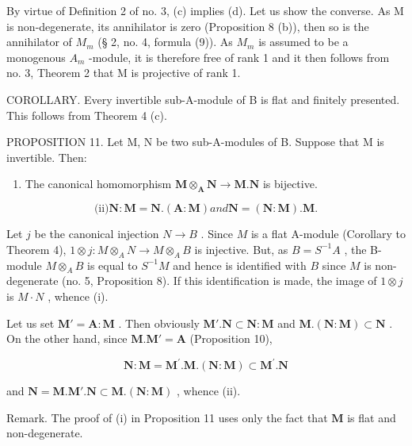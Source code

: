By virtue of Definition 2 of no. 3, (c) implies (d). Let us show the converse. As M is non-degenerate, its annihilator is zero (Proposition 8 (b)), then so is the annihilator of \(M_{m}\) (§ 2, no. 4, formula (9)). As \(M_{m}\) is assumed to be a monogenous \(A_{m}\) -module, it is therefore free of rank 1 and it then follows from no. 3, Theorem 2 that M is projective of rank 1.

COROLLARY. Every invertible sub-A-module of B is flat and finitely presented. This follows from Theorem 4 (c).

PROPOSITION 11. Let M, N be two sub-A-modules of B. Suppose that M is invertible. Then:

\begin{enumerate}
\def\labelenumi{(\roman{enumi})}
\tightlist
\item
  The canonical homomorphism \(\mathbf{M} \otimes_{\mathbf{A}} \mathbf{N} \to \mathbf{M}. \mathbf{N}\) is bijective.
\end{enumerate}

\[
\text {(ii)} \mathbf {N}: \mathbf {M} = \mathbf {N}. (\mathbf {A}: \mathbf {M}) a n d \mathbf {N} = (\mathbf {N}: \mathbf {M}). \mathbf {M}.
\]

Let \(j\) be the canonical injection \(N \to B\) . Since \(M\) is a flat A-module (Corollary to Theorem 4), \(1 \otimes j \colon M \otimes_{A} N \to M \otimes_{A} B\) is injective. But, as \(B = S^{-1}A\) , the B-module \(M \otimes_{A} B\) is equal to \(S^{-1}M\) and hence is identified with \(B\) since \(M\) is non-degenerate (no. 5, Proposition 8). If this identification is made, the image of \(1 \otimes j\) is \(M \cdot N\) , whence (i).

Let us set \(\mathbf{M}' = \mathbf{A} : \mathbf{M}\) . Then obviously \(\mathbf{M}' . \mathbf{N} \subset \mathbf{N} : \mathbf{M}\) and \(\mathbf{M} . (\mathbf{N} : \mathbf{M}) \subset \mathbf{N}\) . On the other hand, since \(\mathbf{M} . \mathbf{M}' = \mathbf{A}\) (Proposition 10),

\[
\mathbf {N}: \mathbf {M} = \mathbf {M} ^ {\prime}. \mathbf {M}. (\mathbf {N}: \mathbf {M}) \subset \mathbf {M} ^ {\prime}. \mathbf {N}
\]

and \(\mathbf{N} = \mathbf{M}.\mathbf{M}'.\mathbf{N}\subset \mathbf{M}.(\mathbf{N}:\mathbf{M})\) , whence (ii).

Remark. The proof of (i) in Proposition 11 uses only the fact that \(\mathbf{M}\) is flat and non-degenerate.

